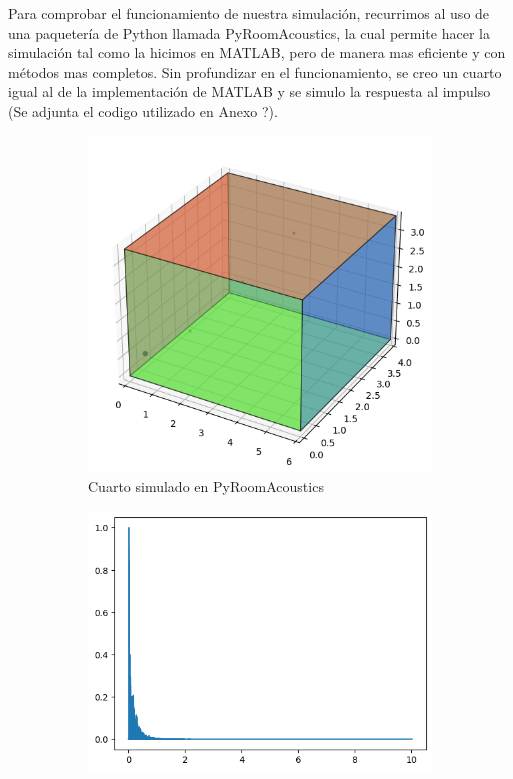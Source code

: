 \FloatBarrier
Para comprobar el funcionamiento de nuestra simulación, recurrimos al uso de una paquetería de Python llamada PyRoomAcoustics, la cual permite hacer la simulación tal como la hicimos en MATLAB, pero de manera mas eficiente y con métodos mas completos. Sin profundizar en el funcionamiento, se creo un cuarto igual al de la implementación de MATLAB y se simulo la respuesta al impulso (Se adjunta el codigo utilizado en Anexo ?).
\begin{figure}[!htb]
    \centering
     \begin{subfigure}{0.3\textwidth}
        \centering
        \includegraphics[width=\linewidth]{imagenes/PyRoom_Room.png}
        \caption{\footnotesize Cuarto simulado en PyRoomAcoustics}
        \label{fig:sub2_1}
    \end{subfigure}
    \hfill
    \begin{subfigure}{0.3\textwidth}
        \centering
        \includegraphics[width=\linewidth]{imagenes/PyRoom_RIR.png}

\end{subfigure}
\end{figure}
